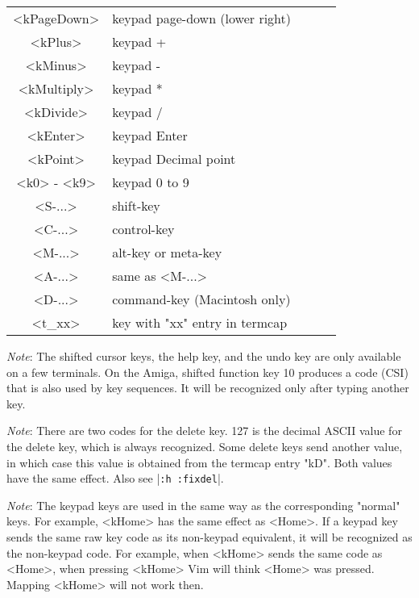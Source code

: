\begin{description}
\begin{tabularx}{\textwidth}{|c|X|c|c|c|}
				<kPageDown>      & keypad page-down (lower right) &  &  & \label{keypad-page-down}\\
				<kPlus>          & keypad +                       &  &  & \label{keypad-plus}\\
				<kMinus>         & keypad -                       &  &  & \label{keypad-minus}\\
				<kMultiply>      & keypad *                       &  &  & \label{keypad-multiply}\\
				<kDivide>        & keypad /                       &  &  & \label{keypad-divide}\\
				<kEnter>         & keypad Enter                   &  &  & \label{keypad-enter}\\
				<kPoint>         & keypad Decimal point           &  &  & \label{keypad-point}\\
				<k0> - <k9>      & keypad 0 to 9                  &  &  & \label{keypad-0} \label{keypad-9}\\
				<S-...>          & shift-key                      &  &  & \label{shift} \label{<S-}\\
				<C-...>          & control-key                    &  &  & \label{control} \label{ctrl} \label{<C-}\\
				<M-...>          & alt-key or meta-key            &  &  & \label{meta} \label{alt} \label{<M-}\\
				<A-...>          & same as <M-...>                &  &  & \label{<A-}\\
				<D-...>          & command-key (Macintosh only)   &  &  & \label{<D-}\\
				<t\_xx>          & key with "xx" entry in termcap &  &  & \\ \hline

\end{tabularx}

\textit{Note}: The shifted cursor keys, the help key, and the undo key are only available on a few terminals.
On the Amiga, shifted function key 10 produces a code (CSI) that is also used by key sequences.
It will be recognized only after typing another key.

\textit{Note}: There are two codes for the delete key.
127 is the decimal ASCII value for the delete key, which is always recognized.
Some delete keys send another value, in which case this value is obtained from the termcap entry "kD".
Both values have the same effect.
Also see |\texttt{:h :fixdel}|.

\textit{Note}: The keypad keys are used in the same way as the corresponding "normal" keys.
For example, <kHome> has the same effect as <Home>.
If a keypad key sends the same raw key code as its non-keypad equivalent, it will be recognized as the non-keypad code.
For example, when <kHome> sends the same code as <Home>, when pressing <kHome> Vim will think <Home> was pressed.
Mapping <kHome> will not work then.


\end{description}
